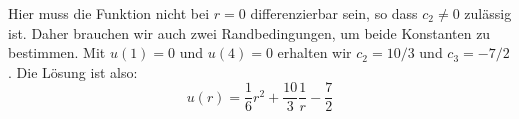 \documentclass[11pt, ngerman, fleqn]{article}
\begin{document}
Hier muss die Funktion nicht bei $r = 0$ differenzierbar sein, so dass $c_2
\neq 0$ zulässig ist. Daher brauchen wir auch zwei Randbedingungen, um beide
Konstanten zu bestimmen. Mit $u(1) = 0$ und $u(4) = 0$ erhalten wir $c_2 =
10/3$ und $c_3 = - 7/2$. Die Lösung ist also:
\[
	u(r) = \frac 16 r^2 + \frac{10}{3} \frac{1}{r} - \frac 72
\]

%
%
\end{document}
